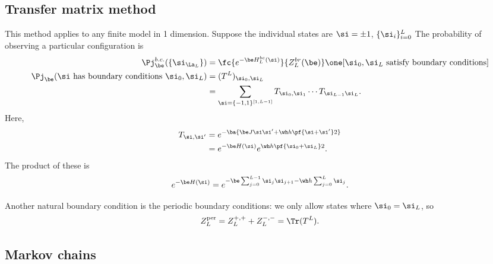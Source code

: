 
\subsection{Transfer matrix method}

This method applies to any finite model in 1 dimension. Suppose the individual states are $\si=\pm1$, $\{\si_i\}_{i=0}^L$
The probability of observing a particular configuration is %
\begin{align}
\Pj_\be^{b.c.}(\{\si_{\La_L}\}) &= \fc{e^{-\be H_L^{bc}(\si)}}{Z_L^{br}(\be)}\one[\si_0,\si_L\text{ satisfy boundary conditions}]\\
\Pj_\be(\si\text{ has boundary conditions } \si_0,\si_L)&=(T^L)_{\si_0,\si_L} \\
&= \sum_{\si =\{-1,1\}^{[1,L-1]}} T_{\si_0,\si_1}\cdots T_{\si_{L-1}\si_L}.
\end{align}
Here, 
\begin{align}
T_{\si,\si'} &= e^{-\ba{\be J \si\si' + \wh h\pf{\si+\si'}2}}\\
&= e^{-\be H(\si)} e^{\wh h\pf{\si_0+\si_L}2}.
\end{align}
The product of these is
\[
e^{-\be H(\si)} = e^{-\be \sum_{j=0}^{L-1}\si_j\si_{j+1} - \wh h \sum_{j=0}^L \si_j}.
\]

Another natural boundary condition is the periodic boundary conditions: we only allow states where $\si_0=\si_L$, so 
\[
Z_L^{\text{per}} = Z_L^{+,+}+Z_L^{-,-} = \Tr (T^L).
\]

\subsection{Markov chains}

